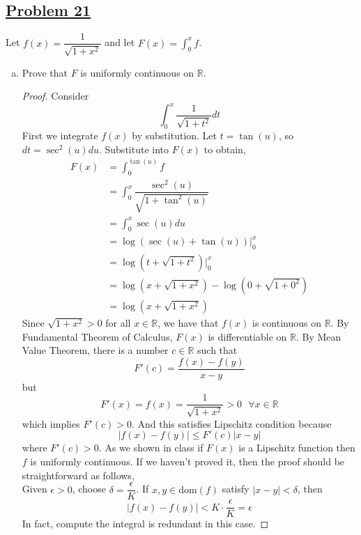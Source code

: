 \documentclass[10pt,letterpaper]{article}
\begin{document}
	\subsection*{{\color{purple}\underline{Problem 21}}}
	Let $f(x) = \dfrac{1}{\sqrt{1 + x^2}}$ and let $F(x) = \displaystyle\int_0^x f$.
\begin{enumerate}[(a)]
\item Prove that $F$ is uniformly continuous on $\mathbb{R}$.
\begin{proof}
	Consider
	$$\displaystyle\int_{0}^{x} \dfrac{1}{\sqrt{1 + t^2}}dt$$
	First we integrate $f(x)$ by substitution. Let $t = \tan(u)$, so 
	$dt = \sec^2(u) du$. Substitute into $F(x)$ to obtain,
\begin{align*}
	F(x) &= \displaystyle\int_0^{\tan(u)} f \\
&= \displaystyle\int_{0}^{x} \dfrac{\sec^2(u)}{\sqrt{1 + \tan^2(u)}} \\
&= \displaystyle\int_{0}^{x} \sec(u)du \\
&= \log(\sec(u) + \tan(u))\bigg|_{0}^{x}\\
&= \log(t + \sqrt{1 + t^2})\bigg|_{0}^{x} \\
&= \log(x + \sqrt{1 + x^2}) - \log(0 + \sqrt{1 + 0^2}) \\	
&= \log(x + \sqrt{1 + x^2})
\end{align*}
	Since $\sqrt{1 + x^2} > 0$ for all $x \in \mathbb{R}$, we have that
	$f(x)$ is continuous on $\mathbb{R}$. By Fundamental Theorem of Calculus, $F(x)$
	is differentiable on $\mathbb{R}$. By Mean Value Theorem, there is a number $c \in \mathbb{R}$
	such that 
	$$F'(c) = \dfrac{f(x) - f(y)}{x - y}$$
	but 
	$$F'(x) = f(x) = \dfrac{1}{\sqrt{1 + x^2}} > 0 \, \, \, \, \forall x \in \mathbb{R}$$
	which implies $F'(c) > 0$. And this satisfies Lipschitz condition because
	$$|f(x) - f(y)| \leq F'(c)|x - y|$$
	where $F'(c) > 0$. As we shown in class if $F(x)$ is a Lipschitz function then $f$ is uniformly continuous.
	If we haven't proved it, then the proof should be straightforward as follows, \\
	Given $\epsilon > 0$, choose $\delta = \dfrac{\epsilon}{K}$. If $x, y \in \mathrm{dom}(f)$ satisfy
	$|x - y| < \delta$, then
	$$|f(x) - f(y)| < K \cdot \dfrac{\epsilon}{K} = \epsilon$$
	In fact, compute the integral is redundant in this case.
\end{proof}




\end{enumerate}
\end{document}
